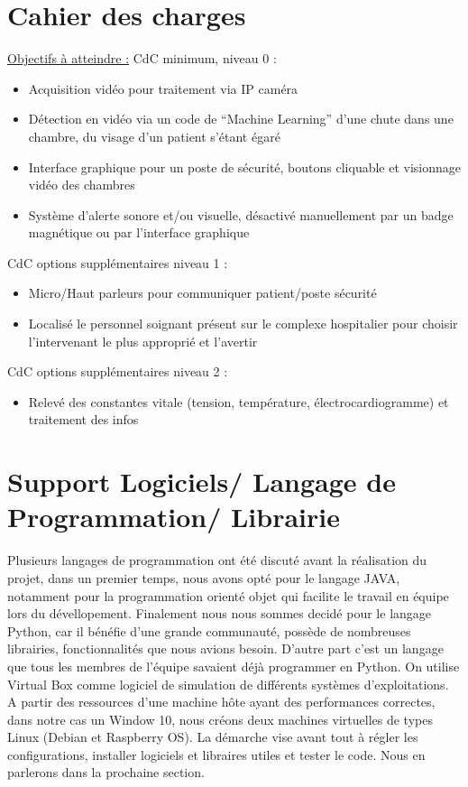 \documentclass[a4paper]{report}
\begin{document}
        \section{Cahier des charges}
        
    \underline{Objectifs à atteindre :}\newline
        CdC minimum, niveau 0 :
    \begin{itemize}
        \item Acquisition vidéo pour traitement via IP caméra
        \item Détection en vidéo via un code de “Machine Learning” d’une chute dans une chambre, du visage d’un patient s’étant égaré
        \item Interface graphique pour un poste de sécurité, boutons cliquable et visionnage vidéo des chambres
        \item Système d’alerte sonore et/ou visuelle, désactivé manuellement par un badge magnétique ou par l’interface graphique
    \end{itemize} 
        CdC options supplémentaires niveau 1 :
    \begin{itemize}
        \item Micro/Haut parleurs pour communiquer patient/poste sécurité
        \item Localisé le personnel soignant présent sur le complexe hospitalier pour choisir l’intervenant le plus approprié et l’avertir
    \end{itemize}
        CdC options supplémentaires niveau 2 :
    \begin{itemize}
        \item Relevé des constantes vitale (tension, température, électrocardiogramme) et traitement des infos
    \end{itemize}
        
        \section{Support Logiciels/ Langage de Programmation/ Librairie}
        
        Plusieurs langages de programmation ont été discuté avant la réalisation du projet, dans un premier temps, nous avons opté pour le langage JAVA, notamment pour la programmation orienté objet qui facilite le travail en équipe lors du dévellopement. Finalement nous nous sommes decidé pour le langage Python, car il bénéfie d'une grande communauté, possède de nombreuses librairies, fonctionnalités que nous avions besoin. D'autre part c'est un langage que tous les membres de l'équipe savaient déjà programmer en Python.
        On utilise Virtual Box comme logiciel de simulation de différents systèmes d'exploitations.
    A partir des ressources d'une machine h\^{o}te ayant des performances correctes, dans notre 
    cas un Window 10, nous créons deux machines virtuelles de types Linux (Debian et Raspberry OS).
    La démarche vise avant tout à régler les configurations, installer logiciels et libraires utiles et 
    tester le code. Nous en parlerons dans la prochaine section.
\end{document}
